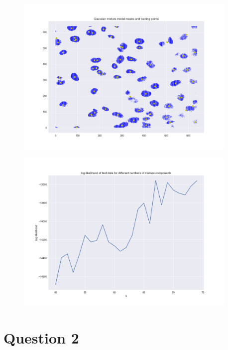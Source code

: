 \documentclass[a4paper]{article}
\begin{document}
\begin{figure}[p]
\begin{minipage}[b]{0.5\textwidth}
\centering
\includegraphics[width=0.95\textwidth]{mixmu}
\label{fig:mixmu}
\end{minipage}%
\begin{minipage}[b]{0.5\textwidth}
\centering
\includegraphics[width=0.95\textwidth]{kvals}
\label{fig:kvals}
\end{minipage}%
\end{figure}

\newpage

\section*{Question 2}
\end{document}
